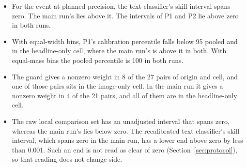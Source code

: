 \begin{itemize}
\item For the event at planned precision, the text classifier's skill interval spans zero. The main run's lies above it. The intervals of P1 and P2 lie above zero in both runs.
\item With equal-width bins, P1's calibration percentile falls below 95 pooled and in the headline-only cell, where the main run's is above it in both. With equal-mass bins the pooled percentile is 100 in both runs.
\item The guard gives a nonzero weight in 8 of the 27 pairs of origin and cell, and one of those pairs sits in the image-only cell. In the main run it gives a nonzero weight in 4 of the 21 pairs, and all of them are in the headline-only cell.
\item The raw local comparison set has an unadjusted interval that spans zero, whereas the main run's lies below zero. The recalibrated text classifier's skill interval, which spans zero in the main run, has a lower end above zero by less than 0.001. Such an end is not read as clear of zero (Section~\ref{sec:protocol}), so that reading does not change side.

\end{itemize}
